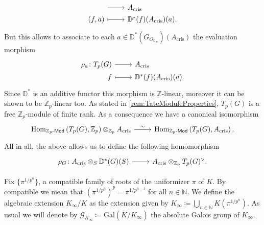 \begin{rem}[]
\begin{equation*}
\begin{tikzcd}[row sep = 0ex
		,/tikz/column 1/.append style={anchor=base east}
		,/tikz/column 2/.append style={anchor=base west}]
		\arrow[r, "", rightarrow] &
		A_{\mathrm{cris}} \\
		(f,a) \arrow[r, "", mapsto] &
		\mathbb{D}^*(f)(A_{\mathrm{cris}})(a)
	.\end{tikzcd}
	\end{equation*} 
	But this allows to associate to each $a \in \mathbb{D}^*(G_{O_{\mathbb{C}_K}})(A_{\mathrm{cris}})$
	the evaluation morphism
	\begin{equation*}
	\begin{tikzcd}[row sep = 0ex
		,/tikz/column 1/.append style={anchor=base east}
		,/tikz/column 2/.append style={anchor=base west}]
		\rho_a\colon T_p(G)
		\arrow[r, "", rightarrow] &
		A_{\mathrm{cris}} \\
		f \arrow[r, "", mapsto] & 
		\mathbb{D}^*(f)(A_{\mathrm{cris}})(a)
	.\end{tikzcd}
	\end{equation*} 
	Since $\mathbb{D}^*$ is an additive functor this morphism
	is $\mathbb{Z}$-linear, moreover it can be shown to be $\mathbb{Z}_{p}$-linear too.
	As stated in \cref{rem:TateModuleProperties}, $T_p(G)$ is a free
	$\mathbb{Z}_{p}$-module of finite rank.
	As a consequence we have a canonical isomorphism
	\begin{equation*}
	\begin{tikzcd}[row sep = 0ex
		,/tikz/column 1/.append style={anchor=base east}
		,/tikz/column 2/.append style={anchor=base west}]
		\mathrm{Hom}_{\mathbb{Z}_{p}\text{-}\mathsf{Mod}}
		\left( T_p(G), \mathbb{Z}_{p} \right) \otimes_{\mathbb{Z}_{p}} A_{\mathrm{cris}}
		\arrow[r, "\sim", rightarrow] &
		\mathrm{Hom}_{ \mathbb{Z}_{p}\text{-}\mathsf{Mod} } \left( T_p(G), A_{\mathrm{cris}} \right)
	.\end{tikzcd}
	\end{equation*} 
	All in all, the above allows us to define the following
	homomorphism
	\begin{equation*}
	\begin{tikzcd}[row sep = 0ex
		,/tikz/column 1/.append style={anchor=base east}
		,/tikz/column 2/.append style={anchor=base west}]
		\rho_G\colon 
		A_{\mathrm{cris}} \otimes_S \mathbb{D}^*(G)(S)
		\arrow[r, "", rightarrow] &
		A_{\mathrm{cris}} \otimes_{\mathbb{Z}_{p}} T_p(G)^\vee
	.\end{tikzcd}
	\end{equation*} 
\end{rem}


\begin{defn}[]
	Fix $\big\{ \pi^{1/p^n} \big\}$,
	a compatible family of roots of the uniformizer $\pi$ of $K$.
	By compatible we mean that $(\pi^{1/p^n})^p = \pi^{1/p^{n-1}}$
	for all $n \in \mathbb{N}$.
	We define the algebraic extension $K_{\infty}/K$ as the extension given
	by $K_\infty \coloneqq \bigcup_{n \in \mathbb{N}} K(\pi^{1/p^n})$.
	As usual we will denote by $\mathscr{G}_{K_\infty} \coloneqq \mathrm{Gal}
	\left( \overline{K} / K_\infty \right)$ 
	the absolute Galois group of $K_\infty$.
\end{defn}



